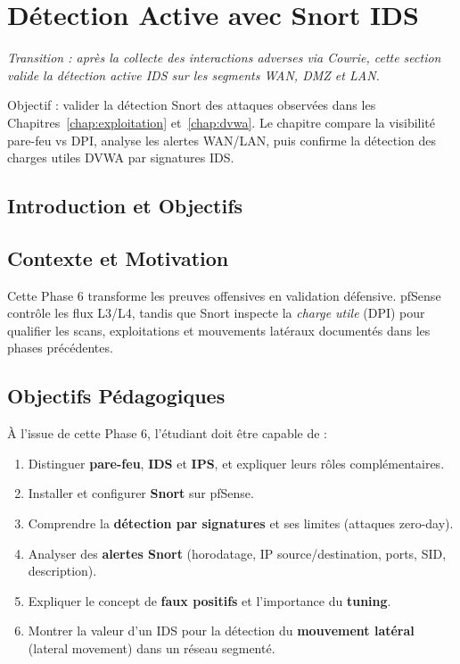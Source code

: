\documentclass[12pt,a4paper,openany]{report}
\begin{document}
	\section{Détection Active avec Snort IDS}
	\label{sec:snort}
	
	\noindent\textit{Transition : après la collecte des interactions adverses via Cowrie, cette section valide la détection active IDS sur les segments WAN, DMZ et LAN.}
	
	\begin{tcolorbox}[colback=primary!5!white, colframe=primary, title=\textbf{Objectifs du Chapitre}]
		Objectif : valider la détection Snort des attaques observées dans les Chapitres~\ref{chap:exploitation} et~\ref{chap:dvwa}. Le chapitre compare la visibilité pare-feu vs DPI, analyse les alertes WAN/LAN, puis confirme la détection des charges utiles DVWA par signatures IDS.
	\end{tcolorbox}
	
	\subsection{Introduction et Objectifs}
	
	\subsection{Contexte et Motivation}
	
	Cette Phase 6 transforme les preuves offensives en validation défensive. pfSense contrôle les flux L3/L4, tandis que Snort inspecte la \textit{charge utile} (DPI) pour qualifier les scans, exploitations et mouvements latéraux documentés dans les phases précédentes.
	
	\subsection{Objectifs Pédagogiques}
	
	À l'issue de cette Phase 6, l'étudiant doit être capable de :
	
	\begin{enumerate}[leftmargin=*]
		\item Distinguer \textbf{pare-feu}, \textbf{IDS} et \textbf{IPS}, et expliquer leurs rôles complémentaires.
		\item Installer et configurer \textbf{Snort} sur pfSense.
		\item Comprendre la \textbf{détection par signatures} et ses limites (attaques zero-day).
		\item Analyser des \textbf{alertes Snort} (horodatage, IP source/destination, ports, SID, description).
		\item Expliquer le concept de \textbf{faux positifs} et l'importance du \textbf{tuning}.
		\item Montrer la valeur d'un IDS pour la détection du \textbf{mouvement latéral} (lateral movement) dans un réseau segmenté.
	\end{enumerate}
	
\end{document}
